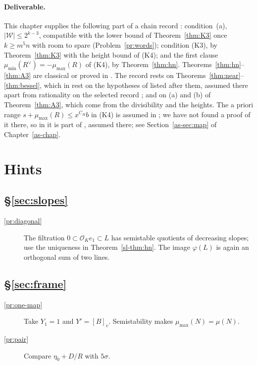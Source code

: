 \documentclass[reqno]{amsart}
\newcounter{chap}
\theoremstyle{definition}
\theoremstyle{plain}
\newcommand{\Oc}{\mathcal{O}}
\newcommand{\Wc}{\mathcal{W}}
\newcommand{\mumax}{\mu_{\max}}
\newcommand{\mumin}{\mu_{\min}}
\begin{document}
\paragraph{Deliverable.}
This chapter supplies the following part of a chain record \cite[Def.~18.9]{Adr}: condition~(a), \(\lvert\Wc\rvert \le 2^{k-3}\), compatible with the lower bound of Theorem~\ref{thm:K3} once \(k \ge m^5n\) with room to spare (Problem~\ref{pr:words}); condition (K3), by Theorem~\ref{thm:K3} with the height bound of (K4); and the first clause \(\mumin(R^\vee) = -\mumax(R)\) of (K4), by Theorem~\ref{thm:hn}.  Theorems~\ref{thm:hn}--\ref{thm:A3} are classical or proved in \cite{Adr}.  The record rests on Theorems~\ref{thm:near}--\ref{thm:bessel}, which in \cite{Adr} rest on the hypotheses of \cite[\S14]{Adr} listed after them, assumed there apart from rationality on the selected record \cite[(14.15)]{Adr}; and on (a) and (b) of Theorem~\ref{thm:A3}, which come from the divisibility and the heights.  The a priori range \(s + \mumax(R) \le x^{C_H}b\) in (K4) is assumed in \cite[Prop.~18.11(iii)]{Adr}; we have not found a proof of it there, so in \cite{Adr} it is part of \cite[Hyp.~18.10]{Adr}, assumed there; see Section~\ref{as-sec:map} of Chapter~\ref{as-chap}.

\section*{Hints}

\subsection*{\S\ref{sec:slopes}}
\begin{description}
\item[\ref{pr:diagonal}] The filtration \(0 \subset \Oc_Ke_1 \subset L\) has semistable quotients of decreasing slopes; use the uniqueness in Theorem~\ref{sl-thm:hn}.  The image \(\varphi(L)\) is again an orthogonal sum of two lines.
\end{description}

\subsection*{\S\ref{sec:frame}}
\begin{description}
\item[\ref{pr:one-map}] Take \(Y_1 = 1\) and \(Y' = [B]_v\).  Semistability makes \(\mumax(N) = \mu(N)\).
\item[\ref{pr:pair}] Compare \(\eta_0 + D/R\) with \(5\sigma\).
\end{description}
\end{document}
